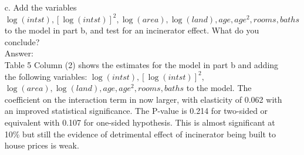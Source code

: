 \documentclass[10pt]{article}
\begin{document}
\begin{enumerate}
\item[c.] Add the variables $\log(intst),[\log(intst)]^2,\log(area),\log(land),age,age^2,rooms,baths$ to the model in part b, and test for an incinerator effect. What do you conclude?
\\ Answer:\\
Table 5 Column (2) shows the estimates for the model in part b and adding the following variables: $\log(intst),[\log(intst)]^2,$ $\log(area),\log(land),age,age^2,rooms,baths$ to the model. The coefficient on the interaction term in now larger, with elasticity of 0.062 with an improved statistical significance. The P-value is 0.214 for two-sided or equivalent with 0.107 for one-sided hypothesis. This is almost significant at 10\% but still the evidence of detrimental effect of incinerator being built to house prices is weak.

\end{enumerate}
\end{document}
